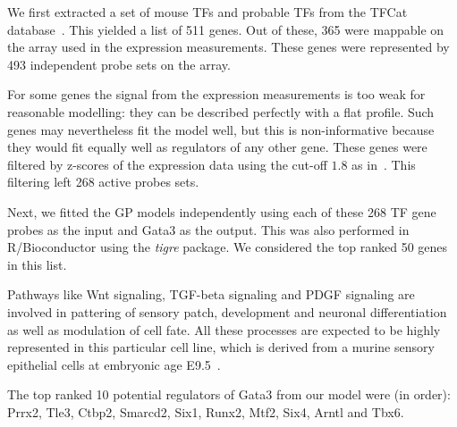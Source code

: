 \documentclass{article}
\begin{document}
We first extracted a set of  mouse TFs and probable TFs from the TFCat
database~\cite{Fulton2009}.  This yielded a list of 511 genes.  Out of
these,  365  were  mappable  on  the  array  used  in  the  expression
measurements.  These  genes were represented by  493 independent probe
sets on the array.

For some genes the signal from the expression measurements is too weak
for reasonable modelling: they can  be described perfectly with a flat
profile.  Such genes may nevertheless  fit the model well, but this is
non-informative because  they would fit equally well  as regulators of
any  other  gene.   These  genes  were filtered  by  z-scores  of  the
expression      data     using      the      cut-off     $1.8$      as
in~\cite{Honkela:modelbased10}.  This filtering left 268 active probes
sets.

Next, we fitted the GP models independently using each of these 268 TF
gene  probes as  the input  and Gata3  as the  output.  This  was also
performed in R/Bioconductor using the \emph{tigre} package. We considered the top ranked 50 genes in this list. 

Pathways like Wnt signaling, TGF-beta signaling and PDGF signaling are
involved  in  pattering of  sensory  patch,  development and  neuronal
differentiation  as  well  as  modulation  of  cell  fate.  All  these
processes  are expected to  be highly  represented in  this particular
cell line, which is derived  from a murine sensory epithelial cells at
embryonic age E9.5~\cite{Milo2009}.

The top ranked 10 potential regulators of Gata3 from our model were
(in order): Prrx2, Tle3, Ctbp2, Smarcd2, Six1, Runx2,
Mtf2, Six4, Arntl and Tbx6.
\end{document}
